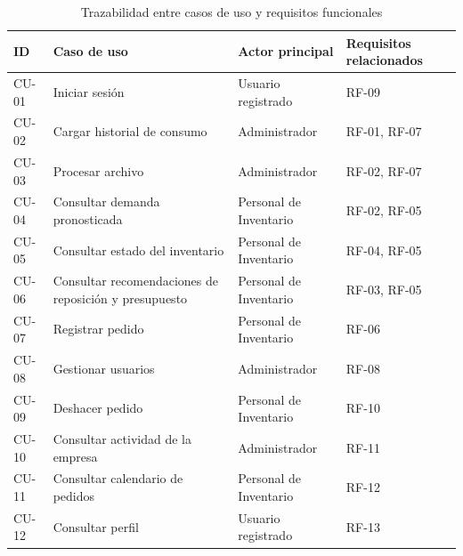 \begin{table}[H]
\centering
\caption{Trazabilidad entre casos de uso y requisitos funcionales}
\label{tab:trazabilidad_casos_uso}
\renewcommand{\arraystretch}{1.3}
\begin{tabularx}{\textwidth}{|>{\centering\arraybackslash}p{1.2cm}|>{\raggedright\arraybackslash}X|>{\raggedright\arraybackslash}X|>{\centering\arraybackslash}p{3cm}|}
\hline
\textbf{ID} & \textbf{Caso de uso} & \textbf{Actor principal} & \textbf{Requisitos relacionados} \\
\hline
CU-01 & Iniciar sesión & Usuario registrado & RF-09 \\
\hline
CU-02 & Cargar historial de consumo & Administrador & RF-01, RF-07 \\
\hline
CU-03 & Procesar archivo & Administrador & RF-02, RF-07 \\
\hline
CU-04 & Consultar demanda pronosticada & Personal de Inventario & RF-02, RF-05 \\
\hline
CU-05 & Consultar estado del inventario & Personal de Inventario & RF-04, RF-05 \\
\hline
CU-06 & Consultar recomendaciones de reposición y presupuesto & Personal de Inventario & RF-03, RF-05 \\
\hline
CU-07 & Registrar pedido & Personal de Inventario & RF-06 \\
\hline
CU-08 & Gestionar usuarios & Administrador & RF-08 \\
\hline
CU-09 & Deshacer pedido & Personal de Inventario & RF-10 \\
\hline
CU-10 & Consultar actividad de la empresa & Administrador & RF-11 \\
\hline
CU-11 & Consultar calendario de pedidos & Personal de Inventario & RF-12 \\
\hline
CU-12 & Consultar perfil & Usuario registrado & RF-13 \\
\hline
\end{tabularx}
\end{table}


